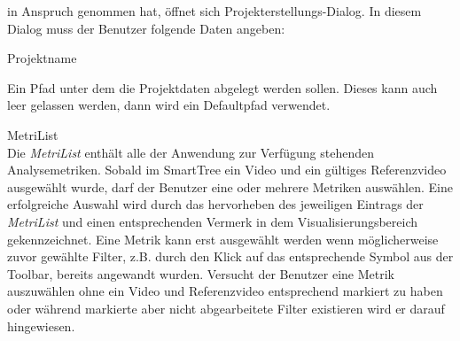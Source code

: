 in Anspruch genommen hat, öffnet sich Projekterstellungs-Dialog. In diesem Dialog
muss der Benutzer folgende Daten angeben:
\begin{compactitem}
\item Projektname
\item Ein Pfad unter dem die Projektdaten abgelegt werden sollen. Dieses kann auch leer gelassen werden, 
dann wird ein Defaultpfad verwendet.
\end{compactitem}

%

 MetriList\\
Die \emph{MetriList} enthält alle der Anwendung zur Verfügung stehenden Analysemetriken.
Sobald im SmartTree ein Video und ein gültiges Referenzvideo ausgewählt wurde, darf der Benutzer
eine oder mehrere Metriken auswählen. Eine erfolgreiche Auswahl wird durch das hervorheben des
jeweiligen Eintrags der \emph{MetriList} und einen entsprechenden Vermerk in dem Visualisierungsbereich
gekennzeichnet. Eine Metrik kann erst ausgewählt werden wenn möglicherweise zuvor gewählte Filter,
z.B. durch den Klick auf das entsprechende Symbol aus der Toolbar, bereits angewandt wurden. Versucht
der Benutzer eine Metrik auszuwählen ohne ein Video und Referenzvideo entsprechend markiert zu haben oder
während markierte aber nicht abgearbeitete Filter existieren wird er darauf hingewiesen.


